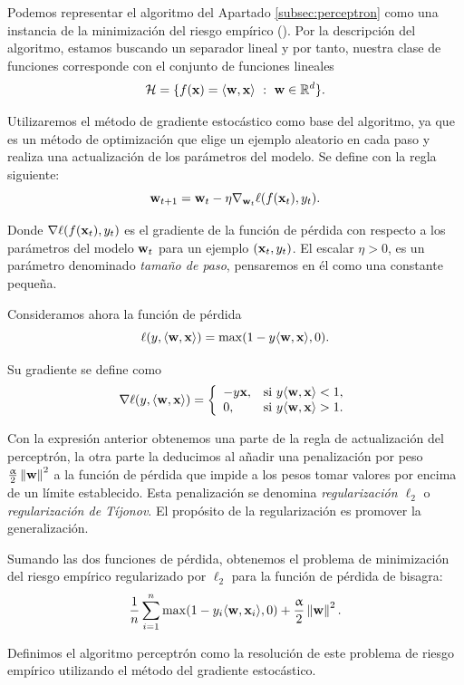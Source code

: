 \documentclass[oneside,openright,titlepage,numbers=noenddot,openany,headinclude,footinclude=true,
cleardoublepage=empty,abstractoff,BCOR=5mm,paper=a4,fontsize=12pt,main=spanish]{scrreprt}
\begin{document}
\begin{example}
Podemos representar el algoritmo del Apartado \ref{subsec:perceptron} como una instancia de la minimización del riesgo empírico (\cite{fairnesslearning2019}). Por la descripción del algoritmo, estamos buscando un separador lineal y por tanto, nuestra clase de funciones corresponde con el conjunto de funciones lineales $$\mathcal H = \{ f(\textbf{x}) = \langle \textbf{w},\textbf{x} \rangle \ : \ \textbf{w} \in \mathbb R^d \}.$$

Utilizaremos el método de gradiente estocástico como base del algoritmo, ya que es un método de optimización que elige un ejemplo aleatorio en cada paso y realiza una actualización de los parámetros del modelo. Se define con la regla siguiente: $$\textbf{w}_{t+1}=\textbf{w}_t-\eta \nabla_{\textbf{w}_t} \ell (f(\textbf{x}_t),y_t).$$

Donde $\nabla \ell (f(\textbf{x}_t),y_t)$ es el gradiente de la función de pérdida con respecto a los parámetros del modelo $\textbf{w}_t$ para un ejemplo $(\textbf{x}_t,y_t)$. El escalar $\eta > 0$, es un parámetro denominado \textit{tamaño de paso}, pensaremos en él como una constante pequeña.

Consideramos ahora la función de pérdida $$\ell(y,\langle \textbf{w},\textbf{x} \rangle)=\max (1-y\langle \textbf{w},\textbf{x} \rangle,0).$$

Su gradiente se define como $$\nabla \ell (y,\langle \textbf{w},\textbf{x} \rangle)=\left \{
\begin{array}{l l}
-y\textbf{x}, & \mbox{si } y\langle \textbf{w},\textbf{x} \rangle < 1, \\
0, & \mbox{si } y\langle \textbf{w},\textbf{x} \rangle > 1.
\end{array}
\right.$$

Con la expresión anterior obtenemos una parte de la regla de actualización del perceptrón, la otra parte la deducimos al añadir una penalización por peso $\frac{\upalpha}{2}\left\lVert\textbf{w}\right\rVert^2$ a la función de pérdida que impide a los pesos tomar valores por encima de un límite establecido. Esta penalización se denomina \textit{regularización $\ell_2$} o \textit{regularización de Tíjonov}. El propósito de la regularización es promover la generalización.

Sumando las dos funciones de pérdida, obtenemos el problema de minimización del riesgo empírico regularizado por $\ell_2$ para la función de pérdida de bisagra: $$\frac{1}{n}\sum_{i=1}^n \max (1-y_i\langle \textbf{w},\textbf{x}_i \rangle,0)+\frac{\upalpha}{2}\left\lVert\textbf{w}\right\rVert^2.$$

Definimos el algoritmo perceptrón como la resolución de este problema de riesgo empírico utilizando el método del gradiente estocástico.
\end{example}
\end{document}
